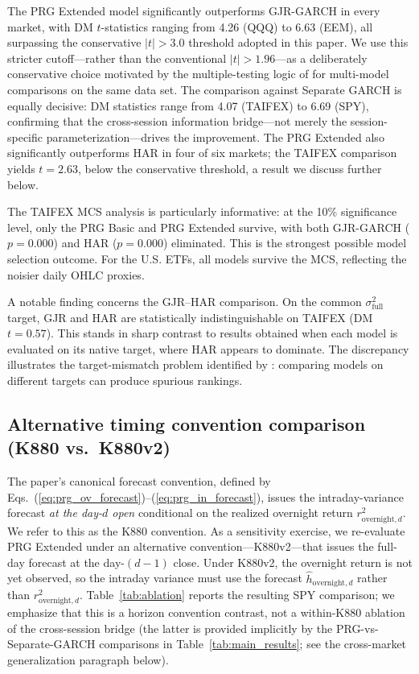 \documentclass[11pt,a4paper]{article}
\begin{document}
The PRG Extended model significantly outperforms GJR-GARCH in every market, with DM $t$-statistics ranging from 4.26 (QQQ) to 6.63 (EEM), all surpassing the conservative $|t|>3.0$ threshold adopted in this paper. We use this stricter cutoff---rather than the conventional $|t|>1.96$---as a deliberately conservative choice motivated by the multiple-testing logic of \citet{Harvey2016} for multi-model comparisons on the same data set. The comparison against Separate GARCH is equally decisive: DM statistics range from 4.07 (TAIFEX) to 6.69 (SPY), confirming that the cross-session information bridge---not merely the session-specific parameterization---drives the improvement. The PRG Extended also significantly outperforms HAR in four of six markets; the TAIFEX comparison yields $t = 2.63$, below the conservative threshold, a result we discuss further below.

The TAIFEX MCS analysis is particularly informative: at the 10\% significance level, only the PRG Basic and PRG Extended survive, with both GJR-GARCH ($p = 0.000$) and HAR ($p = 0.000$) eliminated. This is the strongest possible model selection outcome. For the U.S. ETFs, all models survive the MCS, reflecting the noisier daily OHLC proxies.

A notable finding concerns the GJR--HAR comparison. On the common $\sigma^2_{\text{full}}$ target, GJR and HAR are statistically indistinguishable on TAIFEX (DM $t = 0.57$). This stands in sharp contrast to results obtained when each model is evaluated on its native target, where HAR appears to dominate. The discrepancy illustrates the target-mismatch problem identified by \citet{Patton2011}: comparing models on different targets can produce spurious rankings.

\subsection{Alternative timing convention comparison (K880 vs.\ K880v2)}
\label{sec:timing_convention}

The paper's canonical forecast convention, defined by Eqs.~(\ref{eq:prg_ov_forecast})--(\ref{eq:prg_in_forecast}), issues the intraday-variance forecast \emph{at the day-$d$ open} conditional on the realized overnight return $r^2_{\text{overnight},d}$. We refer to this as the K880 convention. As a sensitivity exercise, we re-evaluate PRG Extended under an alternative convention---K880v2---that issues the full-day forecast at the day-$(d-1)$ close. Under K880v2, the overnight return is not yet observed, so the intraday variance must use the forecast $\hat h_{\text{overnight},d}$ rather than $r^2_{\text{overnight},d}$. Table~\ref{tab:ablation} reports the resulting SPY comparison; we emphasize that this is a horizon convention contrast, not a within-K880 ablation of the cross-session bridge (the latter is provided implicitly by the PRG-vs-Separate-GARCH comparisons in Table~\ref{tab:main_results}; see the cross-market generalization paragraph below).
\end{document}
